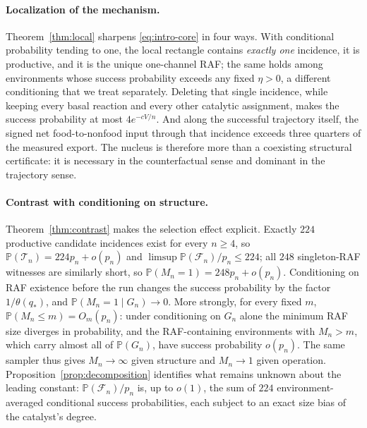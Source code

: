 \documentclass[11pt,letterpaper]{article}
\theoremstyle{plain}
\theoremstyle{definition}
\theoremstyle{remark}
\numberwithin{equation}{section}
\newcommand{\PP}{\mathbb P}
\newcommand{\cF}{\mathcal F}
\newcommand{\cT}{\mathcal T}
\newcommand{\thetaq}{\theta(q_*)}
\begin{document}
\paragraph{Localization of the mechanism.}
Theorem~\ref{thm:local} sharpens \eqref{eq:intro-core} in four ways. With conditional probability tending to one, the local rectangle contains \emph{exactly one} incidence, it is productive, and it is the unique one-channel RAF; the same holds among environments whose success probability exceeds any fixed $\eta>0$, a different conditioning that we treat separately. Deleting that single incidence, while keeping every basal reaction and every other catalytic assignment, makes the success probability at most $4e^{-cV/n}$. And along the successful trajectory itself, the signed net food-to-nonfood input through that incidence exceeds three quarters of the measured export. The nucleus is therefore more than a coexisting structural certificate: it is necessary in the counterfactual sense and dominant in the trajectory sense.

\paragraph{Contrast with conditioning on structure.}
Theorem~\ref{thm:contrast} makes the selection effect explicit. Exactly $224$ productive candidate incidences exist for every $n\ge4$, so $\PP(\cT_n)=224p_n+o(p_n)$ and $\limsup\PP(\cF_n)/p_n\le224$; all $248$ singleton-RAF witnesses are similarly short, so $\PP(M_n=1)=248p_n+o(p_n)$. Conditioning on RAF existence before the run changes the success probability by the factor $1/\thetaq$, and $\PP(M_n=1\mid G_n)\to0$. More strongly, for every fixed $m$, $\PP(M_n\le m)=O_m(p_n)$: under conditioning on $G_n$ alone the minimum RAF size diverges in probability, and the RAF-containing environments with $M_n>m$, which carry almost all of $\PP(G_n)$, have success probability $o(p_n)$. The same sampler thus gives $M_n\to\infty$ given structure and $M_n\to1$ given operation. Proposition~\ref{prop:decomposition} identifies what remains unknown about the leading constant: $\PP(\cF_n)/p_n$ is, up to $o(1)$, the sum of $224$ environment-averaged conditional success probabilities, each subject to an exact size bias of the catalyst's degree.
\end{document}
